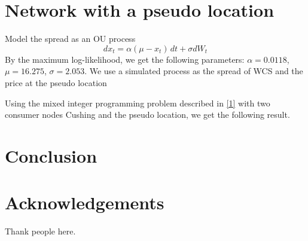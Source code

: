 \documentclass[11pt]{m2pi}
\begin{document}
\section{Network with a pseudo location}
Model the spread as an OU process
\[dx_t  = \alpha(\mu-x_t)\,dt + \sigma dW_t\]
By the maximum log-likelihood, we get the following parameters:  $\alpha=0.0118$,$\mu=16.275$, $\sigma=2.053$.
We use a simulated process as the spread of WCS and the price at the pseudo location


Using the mixed integer programming problem described in \ref{1} with two consumer nodes Cushing and the pseudo location, we get the following result.
\section{Conclusion}

\section*{Acknowledgements}
Thank people here.



\end{document}
